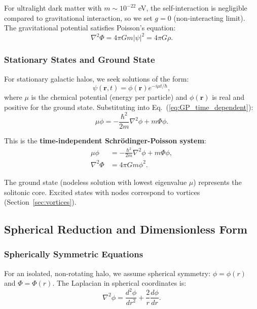 \documentclass[11pt,a4paper]{article}
\theoremstyle{definition}
\theoremstyle{remark}
\begin{document}
For ultralight dark matter with $m \sim 10^{-22}$ eV, the self-interaction is negligible compared to gravitational interaction, so we set $g = 0$ (non-interacting limit). The gravitational potential satisfies Poisson's equation:
\begin{equation}
\label{eq:Poisson}
\nabla^2\Phi = 4\pi G m|\psi|^2 = 4\pi G \rho.
\end{equation}

\subsubsection{Stationary States and Ground State}

For stationary galactic halos, we seek solutions of the form:
\begin{equation}
\psi(\mathbf{r},t) = \phi(\mathbf{r})e^{-i\mu t/\hbar},
\end{equation}
where $\mu$ is the chemical potential (energy per particle) and $\phi(\mathbf{r})$ is real and positive for the ground state. Substituting into Eq.~(\ref{eq:GP_time_dependent}):
\begin{equation}
\label{eq:GP_stationary}
\mu\phi = -\frac{\hbar^2}{2m}\nabla^2\phi + m\Phi\phi.
\end{equation}

This is the \textbf{time-independent Schr\"odinger-Poisson system}:
\begin{align}
\mu\phi &= -\frac{\hbar^2}{2m}\nabla^2\phi + m\Phi\phi, \label{eq:SP_1}\\
\nabla^2\Phi &= 4\pi G m\phi^2. \label{eq:SP_2}
\end{align}

The ground state (nodeless solution with lowest eigenvalue $\mu$) represents the solitonic core. Excited states with nodes correspond to vortices (Section~\ref{sec:vortices}).

\subsection{Spherical Reduction and Dimensionless Form}
\label{sec:spherical_reduction}

\subsubsection{Spherically Symmetric Equations}

For an isolated, non-rotating halo, we assume spherical symmetry: $\phi = \phi(r)$ and $\Phi = \Phi(r)$. The Laplacian in spherical coordinates is:
\begin{equation}
\nabla^2\phi = \frac{d^2\phi}{dr^2} + \frac{2}{r}\frac{d\phi}{dr}.
\end{equation}
\end{document}
